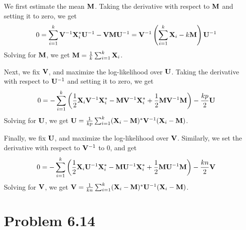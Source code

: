 \documentclass{scrartcl}
\begin{document}
We first estimate the mean $\mathbf{M}$. Taking the derivative with respect to $\mathbf{M}$ and setting it to zero, we get
\begin{equation}
\begin{split}
0 = \sum_{i=1}^k \mathbf{V}^{-1}\mathbf{X}_i^*\mathbf{U}^{-1}-\mathbf{V}\mathbf{M}\mathbf{U}^{-1} 
  = \mathbf{V}^{-1} \left( \sum_{i=1}^k \mathbf{X}_i - k\mathbf{M} \right) \mathbf{U}^{-1}
\end{split}
\end{equation}
Solving for $\mathbf{M}$, we get $\mathbf{M} = {1 \over k} \sum_{i=1}^k \mathbf{X}_i$.

Next, we fix $\mathbf{V}$, and maximize the log-likelihood over $\mathbf{U}$. Taking the derivative with respect to $\mathbf{U}^{-1}$ and setting it to zero, we get
\begin{equation}
0 = - \sum_{i=1}^k \left( {1 \over 2} \mathbf{X}_i\mathbf{V}^{-1}\mathbf{X}_i^* - \mathbf{M}\mathbf{V}^{-1}\mathbf{X}_i^* + {1 \over 2}\mathbf{M}\mathbf{V}^{-1}\mathbf{M} \right)
                  - {kp \over 2} \mathbf{U}
\end{equation}
Solving for $\mathbf{U}$, we get $\mathbf{U} = {1 \over kp}\sum_{i=1}^k (\mathbf{X}_i-\mathbf{M})^*\mathbf{V}^{-1}(\mathbf{X}_i-\mathbf{M})$.

Finally, we fix $\mathbf{U}$, and maximize the log-likelihood over $\mathbf{V}$. Similarly, we set the derivative with respect to $\mathbf{V}^{-1}$ to 0, and get
\begin{equation}
0 = - \sum_{i=1}^k \left( {1 \over 2} \mathbf{X}_i\mathbf{U}^{-1}\mathbf{X}_i^* - \mathbf{M}\mathbf{U}^{-1}\mathbf{X}_i^* + {1 \over 2}\mathbf{M}\mathbf{U}^{-1}\mathbf{M} \right)
                  - {kn \over 2} \mathbf{V}
\end{equation}
Solving for $\mathbf{V}$, we get $\mathbf{V} = {1 \over kn}\sum_{i=1}^k (\mathbf{X}_i-\mathbf{M})^*\mathbf{U}^{-1}(\mathbf{X}_i-\mathbf{M})$.


\section*{Problem 6.14}
\end{document}
